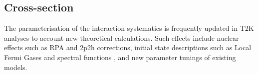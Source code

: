 
\subsection{Cross-section}
\label{subsec:syst_xsec}
The parameterisation of the interaction systematics is frequently updated in T2K analyses to account new theoretical calculations. Such effects include nuclear effects such as RPA and 2p2h corrections\cite{rpa}, initial state descriptions such as Local Fermi Gases \cite{lfg} and spectral functions \cite{benhar}, and new parameter tunings of existing models.
